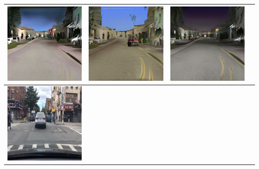 \documentclass{VUMIFPSbakalaurinis}
\begin{document}
\begin{table}[H]
{\begin{tabular}{|c|c|c|c|}
            \includegraphics[scale=0.35]{img/pvz/3_cycle} & \includegraphics[scale=0.35]{img/pvz/3_cut} & \includegraphics[scale=0.35]{img/pvz/3_mspc}
            \\
            \hline
            \includegraphics[scale=0.35]{img/pvz/4_real} & 

\end{tabular}}
\end{table}
\end{document}

